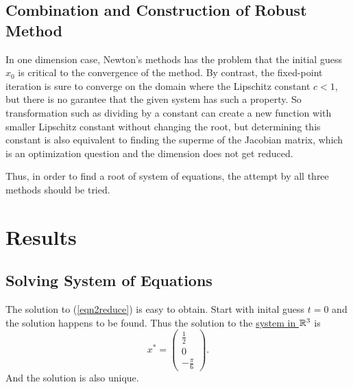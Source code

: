 \begin{table}[H]
\subsection{Combination and Construction of Robust Method}
In one dimension case, Newton's methods has the problem that the initial guess \(x_0\) is critical to the convergence of the method.
By contrast, the fixed-point iteration is sure to converge on the domain where the Lipschitz constant \(c<1\), but there is no garantee that the given system has such a property.
So transformation such as dividing by a constant can create a new function with smaller Lipschitz constant without changing the root, but determining this constant is also equivalent to finding the superme of the Jacobian matrix, which is an optimization question and the dimension does not get reduced.

Thus, in order to find a root of system of equations, the attempt by all three methods should be tried.




\section{Results}

\subsection{Solving System of Equations}
The solution to (\ref{eqn2reduce}) is easy to obtain.
Start with inital guess \(t=0\) and the solution happens to be found.
Thus the solution to the \hyperref[eqn2]{system in \(\mathbb{R}^3\)} is
\[ x^*=\begin{pmatrix} \frac{1}{2} \\ 0 \\ -\frac{\pi}{6} \end{pmatrix}. \]
And the solution is also unique.





\end{table}
